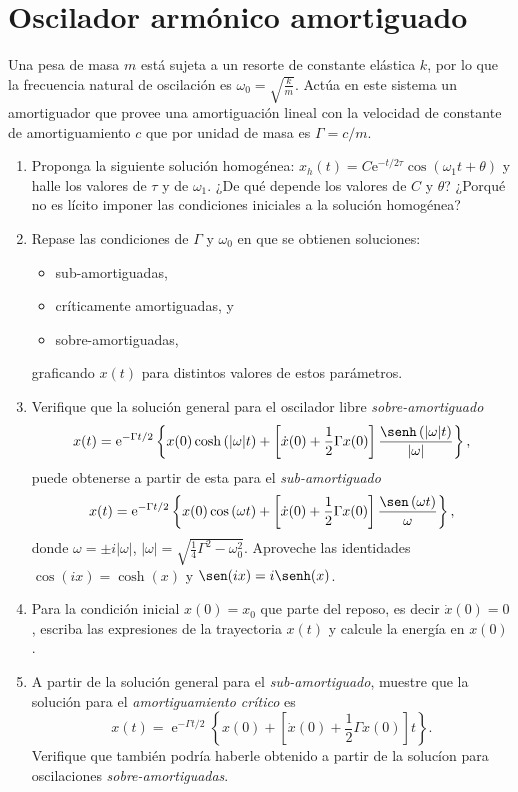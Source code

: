 \section*{Oscilador armónico amortiguado}

\item Una pesa de masa $m$ está sujeta a un resorte de constante elástica $k$, por lo que la frecuencia natural de oscilación es $\omega_0 = \sqrt{ \frac{k}{m} }$.
Actúa en este sistema un amortiguador que provee una amortiguación lineal con la velocidad de constante de amortiguamiento \(c\) que por unidad de masa es $\Gamma= c/m$.
	\begin{enumerate}
	\item Proponga la siguiente solución homogénea: $x_h(t) = C\mathrm{e}^{-t/2\tau}\cos(\omega_1 t + \theta )$ y halle los valores de $\tau$ y de $\omega_1$.
	¿De qué depende los valores de $C$ y $\theta$?
	¿Porqué no es lícito imponer las condiciones iniciales a la solución homogénea?
	\item Repase las condiciones de \(\Gamma\) y \(\omega_0\) en que se obtienen soluciones:
	\begin{itemize}
		\item sub-amortiguadas,
		\item críticamente amortiguadas, y
		\item sobre-amortiguadas,
	\end{itemize} \label{subamortiguado}
	graficando \(x(t)\) para distintos valores de estos parámetros.
	\item Verifique que la solución general para el oscilador libre \emph{sobre-amortiguado}
	\[
		x(t) = \operatorname{e}^{-\Gamma t/2} \left\{ x(0) \cosh \left( |\omega| t \right) + \left[ \dot{x}(0) + \frac{1}{2} \Gamma x(0) \right] \frac{ \senh \left( |\omega| t \right) }{ |\omega| } \right\}, 
	\]
	puede obtenerse a partir de esta para el \emph{sub-amortiguado}
	\[
		x(t) = \operatorname{e}^{-\Gamma t/2} \left\{ x(0) \cos \left( \omega t \right) + \left[ \dot{x}(0) + \frac{1}{2} \Gamma x(0) \right] \frac{ \sen \left( \omega t \right)}{ \omega } \right\}, 
	\]
	donde \(
		\omega = \pm i |\omega|
	\), \(
		|\omega| = \sqrt{\frac{1}{4}\Gamma^{2}-\omega_{0}^{2}}.
	\)
	Aproveche las identidades $\cos( i x ) = \cosh(x)$ y $\sen( i x ) = i \senh(x)$.
	\item Para la condición inicial \(x(0)= x_0\) que parte del reposo, es decir \(\dot{x}(0) = 0\), escriba las expresiones de la trayectoria \(x(t)\) y calcule la energía en \(x(0)\). 
	\item A partir de la solución general para el \emph{sub-amortiguado}, muestre que la solución para el \emph{amortiguamiento crítico} es
	\[
		x(t) = \operatorname{e}^{- \Gamma t / 2} \left\{ x(0) + \left[ \dot{x} (0) + \frac{1}{2} \Gamma x(0) \right] t \right\}.
		\]
	Verifique que también podría haberle obtenido a partir de la solucíon para oscilaciones \emph{sobre-amortiguadas}.
\end{enumerate}


